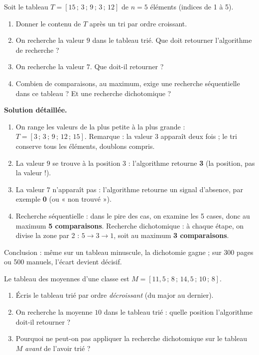 \documentclass[11pt]{article}
\begin{document}
\begin{exoresolu}
Soit le tableau $T = [15\,;\,3\,;\,9\,;\,3\,;\,12]$ de $n = 5$ éléments (indices de 1 à 5).
\begin{enumerate}
  \item Donner le contenu de $T$ après un tri par ordre croissant.
  \item On recherche la valeur $9$ dans le tableau trié. Que doit retourner l'algorithme de recherche ?
  \item On recherche la valeur $7$. Que doit-il retourner ?
  \item Combien de comparaisons, au maximum, exige une recherche séquentielle dans ce tableau ? Et une recherche dichotomique ?
\end{enumerate}
\tcblower
\textbf{Solution détaillée.}
\begin{enumerate}
  \item On range les valeurs de la plus petite à la plus grande : $T = [3\,;\,3\,;\,9\,;\,12\,;\,15]$. Remarque : la valeur $3$ apparaît deux fois ; le tri conserve tous les éléments, doublons compris.
  \item La valeur $9$ se trouve à la position $3$ : l'algorithme retourne \textbf{3} (la position, pas la valeur !).
  \item La valeur $7$ n'apparaît pas : l'algorithme retourne un signal d'absence, par exemple \textbf{0} (ou « non trouvé »).
  \item Recherche séquentielle : dans le pire des cas, on examine les 5 cases, donc au maximum \textbf{5 comparaisons}. Recherche dichotomique : à chaque étape, on divise la zone par 2 : $5 \rightarrow 3 \rightarrow 1$, soit au maximum \textbf{3 comparaisons}.
\end{enumerate}
Conclusion : même sur un tableau minuscule, la dichotomie gagne ; sur 300 pages ou 500 manuels, l'écart devient décisif.
\end{exoresolu}

\begin{exercice}
Le tableau des moyennes d'une classe est $M = [11,5\,;\,8\,;\,14,5\,;\,10\,;\,8]$.
\begin{enumerate}
  \item Écris le tableau trié par ordre \emph{décroissant} (du major au dernier).
  \item On recherche la moyenne $10$ dans le tableau trié : quelle position l'algorithme doit-il retourner ?
  \item Pourquoi ne peut-on pas appliquer la recherche dichotomique sur le tableau $M$ \emph{avant} de l'avoir trié ?
\end{enumerate}
\end{exercice}
\end{document}
